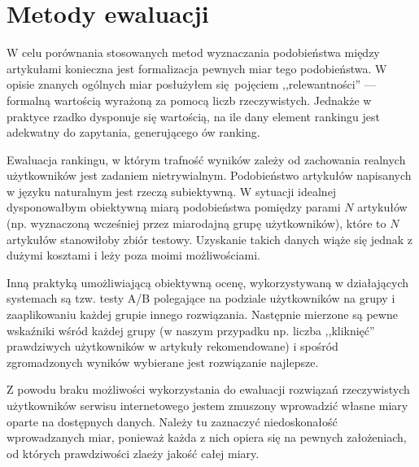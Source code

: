 \documentclass[pl]{minipw} %
\begin{document}
\chapter{Metody ewaluacji}

W celu porównania stosowanych metod wyznaczania podobieństwa między artykułami konieczna jest formalizacja pewnych miar tego podobieństwa. W opisie znanych ogólnych miar posłużyłem się pojęciem ,,relewantności'' --- formalną wartością wyrażoną za pomocą liczb rzeczywistych. Jednakże w praktyce rzadko dysponuje się wartością, na ile dany element rankingu jest adekwatny do zapytania, generującego ów ranking.  

Ewaluacja rankingu, w którym trafność wyników zależy od zachowania realnych użytkowników jest zadaniem nietrywialnym. Podobieństwo artykułów napisanych w języku naturalnym jest rzeczą subiektywną. W sytuacji idealnej dysponowałbym obiektywną miarą podobieństwa pomiędzy parami $N$ artykułów (np. wyznaczoną wcześniej przez miarodajną grupę użytkowników), które to $N$ artykułów stanowiłoby zbiór testowy. Uzyskanie takich danych wiąże się jednak z dużymi kosztami i leży poza moimi możliwościami.

Inną praktyką umożliwiającą obiektywną ocenę, wykorzystywaną w działających systemach są tzw. testy A/B polegające na podziale użytkowników na grupy i zaaplikowaniu każdej grupie innego rozwiązania. Następnie mierzone są pewne wskaźniki wśród każdej grupy (w naszym przypadku np. liczba ,,kliknięć'' prawdziwych użytkowników w artykuły rekomendowane) i spośród zgromadzonych wyników wybierane jest rozwiązanie najlepsze.

Z powodu braku możliwości wykorzystania do ewaluacji rozwiązań rzeczywistych użytkowników serwisu internetowego jestem zmuszony wprowadzić własne miary oparte na dostępnych danych. Należy tu zaznaczyć niedoskonałość wprowadzanych miar, ponieważ każda z nich opiera się na pewnych założeniach, od których prawdziwości zlaeży jakość całej miary.
\end{document}
